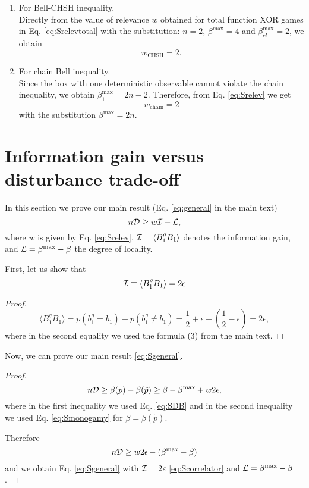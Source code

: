 \documentclass[pra,twocolumn,showpacs,preprintnumbers,amsmath,amssymb,superscriptaddress]{revtex4-1}
\def\be{\begin{equation}}
\def\ee{\end{equation}}
\def\>{\rangle}
\def\<{\langle}
\def\omeas{B_1}
\def\ogentle{B_1^g}
\def\betaMax{\beta^{\max}}
\def\betaMaxcl{\beta^{\max}_{cl}}
\def\dist{{\cal D}}
\def\loc{{\cal L}}
\def\inf{{\cal I}}
\def\relev{w}
\begin{document}
\begin{appendix}
\begin{enumerate}
\item For Bell-CHSH inequality.\\
Directly from the value of relevance $\relev$ obtained for total function XOR games in Eq.  \eqref{eq:Srelevtotal} with the substitution: $n=2$, $\betaMax=4$ and $\betaMaxcl=2$, we obtain
\be
\relev_{\text{CHSH}}=2.
\ee

\item For chain Bell inequality.\\
Since the box with one deterministic observable cannot violate the chain inequality, we obtain $\beta^{\max}_{1}=2n-2$. Therefore, from Eq. \eqref{eq:Srelev} we get
\be
\relev_{\text{chain}}=2
\ee
with the substitution $\betaMax=2n$.

\end{enumerate}

\section{Information gain versus disturbance trade-off}\label{secTRADE}
In this section we prove our main result (Eq. \eqref{eq:general} in the main text)
\be
n \dist \geq  \relev \inf-  \loc,
\label{eq:Sgeneral}
\ee
where $\relev$ is given by Eq. \eqref{eq:Srelev}, $\inf=\<\ogentle\omeas\>$ denotes the information gain, and $\loc=\beta^{\max} - \beta$ the degree of locality.

First, let us show that 
\be
\label{eq:Scorrelator}
\inf \equiv\<\ogentle\omeas\>=2 \epsilon
\ee
\begin{proof}
\be
\<\ogentle\omeas\>=p(b_1^g=b_1)-p(b_1^g\neq b_1)=\frac12+\epsilon-(\frac12-\epsilon)=2\epsilon,
\ee
where in the second equality we used the formula (3) from the main text.
\end{proof}

Now, we can prove our main result \eqref{eq:Sgeneral}. 
\begin{proof}
\be
n \dist \geq \beta(p)- \beta(\tilde p) \geq \beta - \beta^{\max} + \relev 2 \epsilon,
\ee
where in the first inequality we used Eq.  \eqref{eq:SDB} and in the second inequality we used Eq. \eqref{eq:Smonogamy} for $\beta=\beta(\tilde p)$.

Therefore
\be
n \dist \geq \relev 2 \epsilon - (\beta^{\max} - \beta)
\ee
and we obtain Eq. \eqref{eq:Sgeneral} with $\inf= 2 \epsilon$ \eqref{eq:Scorrelator} and $\loc = \beta^{\max} - \beta$.
\end{proof}



\end{appendix}
\end{document}
